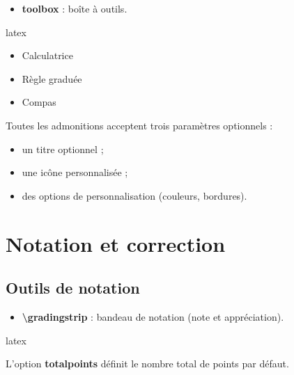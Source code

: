 \documentclass[
    french,
    margin=2cm
]{neoschool}
\begin{document}
\begin{itemize}
\item \textbf{toolbox} : boîte à outils.
\end{itemize}

\begin{code}{latex}
\begin{toolbox}
  \begin{itemize}
    \item Calculatrice
    \item Règle graduée
    \item Compas
  \end{itemize}
\end{toolbox}
\end{code}

Toutes les admonitions acceptent trois paramètres optionnels :

\begin{itemize}
\item un titre optionnel ;
\item une icône personnalisée ;
\item des options de personnalisation (couleurs, bordures).
\end{itemize}

\section{Notation et correction}

\subsection{Outils de notation}

\begin{itemize}
\item \textbf{\textbackslash gradingstrip} : bandeau de notation (note et appréciation).
\end{itemize}

\begin{code}{latex}
\gradingstrip

\gradingstrip[20]
\end{code}

L'option \textbf{totalpoints} définit le nombre total de points par défaut.

\end{document}
